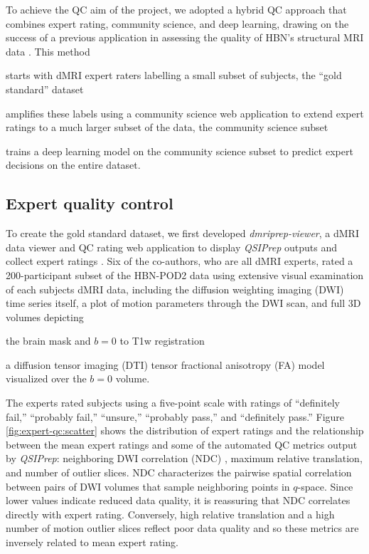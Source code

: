 \documentclass[fleqn,10pt]{wlscirep}
\begin{document}
To achieve the QC aim of the project, we adopted a hybrid QC approach that
combines expert rating, community science, and deep learning, drawing on the success of a previous application in
assessing the quality of HBN's structural MRI data \cite{keshavan2019-er}.
This method
\begin{enumerate*}[%
    label=(\roman*),%
    before={{ }},%
    itemjoin={{, }},%
    itemjoin*={{ and }}]
    \item starts with dMRI expert raters labelling a small subset of subjects,
    the ``gold standard'' dataset
    \item amplifies these labels using a community science web application to
    extend expert ratings to a much larger subset of the data, the community
    science subset
    \item trains a deep learning model on the community science subset to
    predict expert decisions on the entire dataset.
\end{enumerate*}

\subsection*{Expert quality control}

To create the gold standard dataset, we first developed \emph{dmriprep-viewer},
a dMRI data viewer and QC rating web application to display \emph{QSIPrep}
outputs and collect expert ratings \cite{richie-halford2021-viewer}. Six of the
co-authors, who are all dMRI experts, rated a 200-participant subset of the
HBN-POD2 data using extensive visual examination of each subjects dMRI data,
including the diffusion weighting imaging (DWI) time series itself, a plot of
motion parameters through the DWI scan, and full 3D volumes depicting
\begin{enumerate*}[%
    label=(\roman*),%
    before={{ }},%
    itemjoin={{, }},%
    itemjoin*={{ and }}]
    \item the brain mask and $b=0$ to T1w registration
    \item a diffusion tensor imaging (DTI) tensor fractional anisotropy (FA)
    model visualized over the $b=0$ volume.
\end{enumerate*}
The experts rated subjects using a five-point scale with ratings of ``definitely
fail,'' ``probably fail,'' ``unsure,'' ``probably pass,'' and ``definitely
pass.'' Figure \ref{fig:expert-qc:scatter} shows the distribution of expert
ratings and the relationship between the mean expert ratings and some of the
automated QC metrics output by \emph{QSIPrep}: neighboring DWI correlation (NDC)
\cite{yeh2019-kb}, maximum relative translation, and number of outlier slices.
NDC characterizes the pairwise spatial correlation between pairs of DWI volumes
that sample neighboring points in $q$-space. Since lower values indicate reduced
data quality, it is reassuring that NDC correlates directly with expert rating.
Conversely, high relative translation and a high number of motion outlier slices
reflect poor data quality and so these metrics are inversely related to mean
expert rating.
\end{document}
